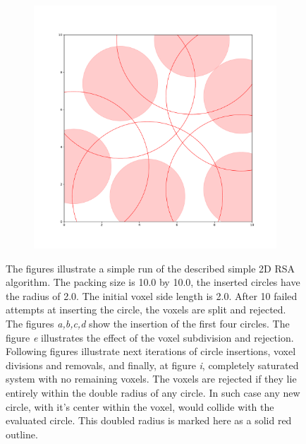 \documentclass[12pt, oneside]{report}
\begin{document}
\begin{figure}[H]
\begin{subfigure}[b]{0.3\linewidth}
    \caption{}
  \end{subfigure}
  \begin{subfigure}[b]{0.3\linewidth}
    \includegraphics[width=\linewidth]{Images/2dCircleRSA/fig9.pdf}
    \caption{}
  \end{subfigure}

  \caption{The figures illustrate a simple run of the described simple 2D RSA algorithm. \newline
		The packing size is 10.0 by 10.0, the inserted circles have the radius of 2.0. The initial voxel side length is 2.0. After 10 failed attempts at inserting the circle, the voxels are split and rejected.\newline
		The figures \textit{a,b,c,d} show the insertion of the first four circles. The figure \textit{e} illustrates the effect of the voxel subdivision and rejection. Following figures illustrate next iterations of circle insertions, voxel divisions and removals, and finally, at figure \textit{i}, completely saturated system with no remaining voxels. \newline
		The voxels are rejected if they lie entirely within the double radius of any circle. In such case any new circle, with it's center within the voxel, would collide with the evaluated circle. This doubled radius is marked here as a solid red outline.}
  \label{VoxelCircleRSApdfExamples}
\end{figure}
\end{document}
